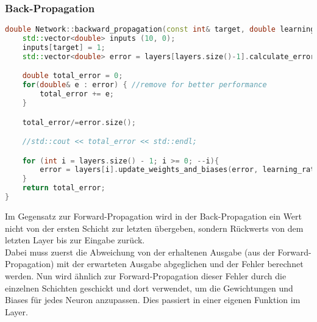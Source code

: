 \subsubsection{Back-Propagation}
\label{sec:RealBackPropagationCode}
\begin{lstlisting}[language=C++]
double Network::backward_propagation(const int& target, double learning_rate){
    std::vector<double> inputs (10, 0);
    inputs[target] = 1;
    std::vector<double> error = layers[layers.size()-1].calculate_error(inputs);

    double total_error = 0;
    for(double& e : error) { //remove for better performance
        total_error += e;
    }

    total_error/=error.size();

    //std::cout << total_error << std::endl;

    for (int i = layers.size() - 1; i >= 0; --i){
        error = layers[i].update_weights_and_biases(error, learning_rate);
    }
    return total_error;
}
\end{lstlisting}
Im Gegensatz zur Forward-Propagation wird in der Back-Propagation ein Wert nicht von der ersten Schicht zur letzten übergeben, sondern Rückwerts von dem letzten Layer bis zur Eingabe zurück.
\\ 
Dabei muss zuerst die Abweichung von der erhaltenen Ausgabe (aus der Forward-Propagation) mit der erwarteten Ausgabe abgeglichen und der Fehler berechnet werden. Nun wird ähnlich zur Forward-Propagation dieser Fehler durch die einzelnen Schichten geschickt und dort verwendet, um die Gewichtungen und Biases für jedes Neuron anzupassen. Dies passiert in einer eigenen Funktion im Layer.

